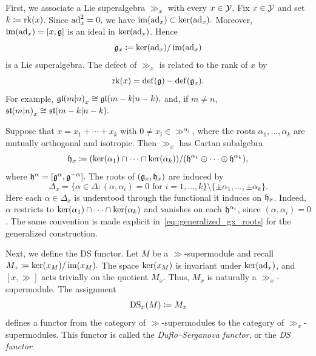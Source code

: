 First, we associate a Lie superalgebra $\gg_{x}$ with every $x\in{\mathcal Y}$. Fix $x\in{\mathcal Y}$ and set $k\coloneqq {\operatorname{rk}}(x)$. Since
$
\operatorname{ad}_{x}^{2}=0,
$
we have
$
\operatorname{im}(\operatorname{ad}_{x})\subset\operatorname{ker}(\operatorname{ad}_{x}).
$
Moreover, $\operatorname{im}(\operatorname{ad}_{x})=[x,{\mathfrak{g}}]$ is an ideal in $\operatorname{ker}(\operatorname{ad}_{x})$. Hence
\begin{equation}
{\mathfrak{g}}_{x}\coloneqq \operatorname{ker}(\operatorname{ad}_{x})/\operatorname{im}(\operatorname{ad}_{x})
\end{equation}
is a Lie superalgebra. The defect of $\gg_{x}$ is related to the rank of $x$ by~\cite[Section~4]{gorelik2022duflo}
\begin{equation}
{\operatorname{rk}}(x)={\mathrm{def}}({\mathfrak{g}})-{\mathrm{def}}({\mathfrak{g}}_{x}).
\end{equation}
For example,
$
{\mathfrak{gl}(m\vert n)}_{x}\cong\mathfrak{gl}(m-k\vert n-k),
$
and, if $m\neq n$,
$
{\mathfrak{sl}(m\vert n)}_{x}\cong{\mathfrak{sl}}(m-k\vert n-k).
$

Suppose that
$
x=x_{1}+\dotsb+x_{k}
$
with $0\neq x_{i}\in\gg^{\alpha_{i}}$, where the roots $\alpha_{1},\dotsc,\alpha_{k}$ are mutually orthogonal and isotropic. Then $\gg_{x}$ has Cartan subalgebra
\begin{equation}
{\mathfrak h}_{x}\coloneqq 
(\operatorname{ker}(\alpha_{1})\cap\dotsb\cap\operatorname{ker}(\alpha_{k}))
/
({\mathfrak h}^{\alpha_{1}}\oplus\dotsb\oplus{\mathfrak h}^{\alpha_{k}}),
\end{equation}
where
$
{\mathfrak h}^{\alpha}=[{\mathfrak{g}}^{\alpha},{\mathfrak{g}}^{-\alpha}].
$
The roots of $({\mathfrak{g}}_{x},{\mathfrak h}_{x})$ are induced by
\begin{equation}
\Delta_{x}
=
\{\alpha\in\Delta:(\alpha,\alpha_{i})=0
\text{ for }i=1,\dotsc,k\}
\setminus
\{\pm\alpha_{1},\dotsc,\pm\alpha_{k}\}.
\end{equation}
Here each $\alpha\in\Delta_x$ is understood through the functional it induces on ${\mathfrak h}_x$. Indeed, $\alpha$ restricts to $\operatorname{ker}(\alpha_1)\cap\dotsb\cap\operatorname{ker}(\alpha_k)$ and vanishes on each ${\mathfrak h}^{\alpha_i}$, since $(\alpha,\alpha_i)=0$. The same convention is made explicit in~\eqref{eq::generalized_gx_roots} for the generalized construction.

Next, we define the DS functor. Let $M$ be a $\gg$-supermodule and recall
$
M_{x}\coloneqq \operatorname{ker}(x_{M})/\operatorname{im}(x_{M}).
$
The space $\operatorname{ker}(x_{M})$ is invariant under $\operatorname{ker}(\operatorname{ad}_{x})$, and $[x,\gg]$ acts trivially on the quotient $M_{x}$. Thus, $M_{x}$ is naturally a $\gg_{x}$-supermodule. The assignment
\begin{equation}
\operatorname{DS}_{x}(M)\coloneqq M_{x}
\end{equation}
defines a functor from the category of $\gg$-supermodules to the category of $\gg_{x}$-supermodules. This functor is called the \emph{Duflo--Serganova functor}, or the \emph{DS functor}.

